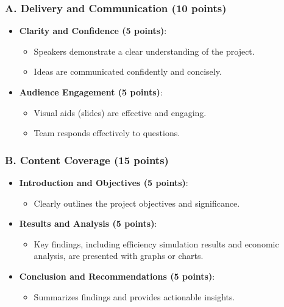 \documentclass[11pt]{article}
\begin{document}
\subsubsection*{A. Delivery and Communication (10 points)}
\begin{itemize}
    \item \textbf{Clarity and Confidence (5 points)}:
    \begin{itemize}
        \item Speakers demonstrate a clear understanding of the project.
        \item Ideas are communicated confidently and concisely.
    \end{itemize}
    \item \textbf{Audience Engagement (5 points)}:
    \begin{itemize}
        \item Visual aids (slides) are effective and engaging.
        \item Team responds effectively to questions.
    \end{itemize}
\end{itemize}

\subsubsection*{B. Content Coverage (15 points)}
\begin{itemize}
    \item \textbf{Introduction and Objectives (5 points)}:
    \begin{itemize}
        \item Clearly outlines the project objectives and significance.
    \end{itemize}
    \item \textbf{Results and Analysis (5 points)}:
    \begin{itemize}
        \item Key findings, including efficiency simulation results and economic analysis, are presented with graphs or charts.
    \end{itemize}
    \item \textbf{Conclusion and Recommendations (5 points)}:
    \begin{itemize}
        \item Summarizes findings and provides actionable insights.
    \end{itemize}
\end{itemize}
\end{document}
